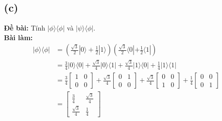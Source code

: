 \subsection{(c)}
\textbf{Đề bài:} Tính $|\phi\rangle\langle\phi|$ và $|\psi\rangle\langle\phi|$.\\
\textbf{Bài làm:}
\begin{align*}
    |\phi\rangle\langle\phi| &= \left(\frac{\sqrt{3}}{2}|0\rangle+\frac{1}{2}|1\rangle\right)\left(\frac{\sqrt{3}}{2}\langle0|+\frac{1}{2}\langle1|\right)\\
    &= \frac{3}{4}|0\rangle\langle0| + \frac{\sqrt{3}}{4}|0\rangle\langle1| + \frac{\sqrt{3}}{4}|1\rangle\langle0| + \frac{1}{4}|1\rangle\langle1|\\
    &= \frac{3}{4} \begin{bmatrix}
        1 & 0 \\
        0 & 0
    \end{bmatrix}
    + \frac{\sqrt{3}}{4} \begin{bmatrix}
        0 & 1 \\
        0 & 0
    \end{bmatrix}
    + \frac{\sqrt{3}}{4} \begin{bmatrix}
        0 & 0 \\
        1 & 0
    \end{bmatrix}
    + \frac{1}{4} \begin{bmatrix}
        0 & 0 \\
        0 & 1
    \end{bmatrix}\\
    &= \begin{bmatrix}
        \frac{3}{4} & \frac{\sqrt{3}}{4} \\
        \frac{\sqrt{3}}{4} & \frac{1}{4}
    \end{bmatrix}
\end{align*}
